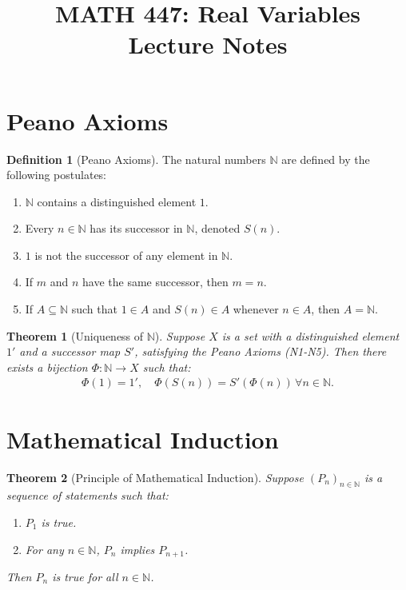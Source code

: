 \documentclass[9pt]{article}
\title{MATH 447: Real Variables \\ Lecture Notes}
\theoremstyle{definition}
\newtheorem{definition}{Definition}
\theoremstyle{plain}
\newtheorem{theorem}{Theorem}
\begin{document}
\maketitle

\section*{Peano Axioms}
\begin{definition}[Peano Axioms]
The natural numbers \( \mathbb{N} \) are defined by the following postulates:
\begin{enumerate}[label=(N\arabic*)]
    \item \( \mathbb{N} \) contains a distinguished element \( 1 \).
    \item Every \( n \in \mathbb{N} \) has its successor in \( \mathbb{N} \), denoted \( S(n) \).
    \item \( 1 \) is not the successor of any element in \( \mathbb{N} \).
    \item If \( m \) and \( n \) have the same successor, then \( m = n \).
    \item If \( A \subseteq \mathbb{N} \) such that \( 1 \in A \) and \( S(n) \in A \) whenever \( n \in A \), then \( A = \mathbb{N} \).
\end{enumerate}
\end{definition}

\begin{theorem}[Uniqueness of \( \mathbb{N} \)]
Suppose \( X \) is a set with a distinguished element \( 1' \) and a successor map \( S' \), satisfying the Peano Axioms (N1-N5). Then there exists a bijection \( \Phi : \mathbb{N} \to X \) such that:
\begin{align*}
    \Phi(1) = 1', \quad \Phi(S(n)) = S'(\Phi(n)) \, \forall n \in \mathbb{N}.
\end{align*}
\end{theorem}

\section*{Mathematical Induction}
\begin{theorem}[Principle of Mathematical Induction]
Suppose \( (P_n)_{n \in \mathbb{N}} \) is a sequence of statements such that:
\begin{enumerate}
    \item \( P_1 \) is true.
    \item For any \( n \in \mathbb{N} \), \( P_n \) implies \( P_{n+1} \).
\end{enumerate}
Then \( P_n \) is true for all \( n \in \mathbb{N} \).
\end{theorem}
\end{document}

